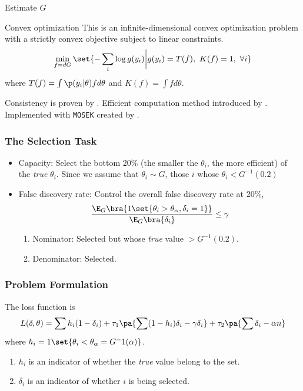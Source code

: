 \documentclass[10pt, aspectratio=169]{beamer}
\begin{document}
\begin{frame}[fragile]{Estimate $G$}

  \begin{block}{Convex optimization}
    This is an \alert{infinite-dimensional} convex optimization problem with a strictly convex objective subject to linear constraints.
    \begin{equation*}
      \min_{f=dG}\set{-\sum_i \log g(y_i)\bigg |g(y_i) = T(f),\ K(f)=1,\ \forall i }
    \end{equation*}
    where $ T(f)=\int \p(y_i |\theta)f d\theta $ and  $K(f)= \int f d\theta$.
  \end{block}

  Consistency is proven by \citet{kiefer1956consistency}. Efficient computation
  method introduced by \citet{koenker2014convex}. Implemented with \verb|MOSEK|
  created by \citet{andersen2010mosek}.
\end{frame}

\begin{frame}
  \frametitle{The Selection Task}
  \begin{itemize}\itemsep=12pt
    \item \alert{Capacity}: Select the bottom 20\% (the smaller the $\theta_i$, the more efficient) of the
          \textit{true} $\theta_i$. Since we assume that $\theta_i \sim G$, those $i$
          whose $\theta_i<G^{-1}(0.2)$
    \item \alert{False discovery rate}: Control the overall false discovery rate at 20\%,
          $$\frac{\E_G\bra{1\set{\theta_i>\theta_{\alpha},\delta_i=1}}}{\E_G\bra{\delta_i}} \le \gamma$$
          \begin{enumerate}
            \item Nominator: Selected but whose \textit{true} value $>G^{-1}(0.2)$.
            \item Denominator: Selected.
          \end{enumerate}
  \end{itemize}
\end{frame}

\begin{frame}
  \frametitle{Problem Formulation}
  The \alert{loss} function is
  \begin{equation*}
    L(\delta,\theta)=\sum h_i(1-\delta_i) +\tau_1\pa{\sum (1-h_i)\delta_i -\gamma \delta_i} + \tau_2 \pa{\sum \delta_i -\alpha n}
  \end{equation*} where $h_i=1\set{\theta_i<\theta_{\alpha}=G^-1(\alpha)}$.
  \begin{enumerate}
    \item $h_i$ is an indicator of whether the \textit{true} value belong to the set.
    \item $\delta_i$ is an indicator of whether $i$ is being selected.
  \end{enumerate}

\end{frame}
\end{document}
